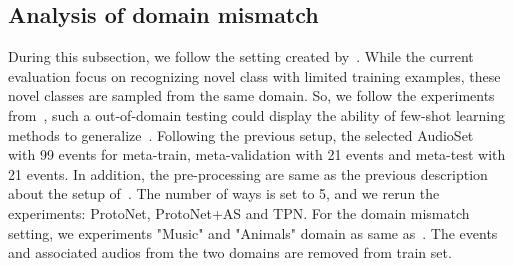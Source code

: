 \documentclass[a4paper]{article}
\begin{document}
\subsection{Analysis of domain mismatch}
\vspace{-2mm}
During this subsection, we follow the setting created by~\cite{fewshotdomain}. While the current evaluation focus on recognizing novel class with limited training examples, these novel classes are sampled from the same domain. So, we follow the experiments from~\cite{fewshotdomain}, such a out-of-domain testing could display the ability of few-shot learning methods to generalize~\cite{domainad,domain_ad}. Following the previous setup, the selected AudioSet~\cite{audioSet} with 99 events for meta-train, meta-validation with 21 events and meta-test with 21 events. In addition, the pre-processing are same as the previous description about the setup of~\cite{attentionSimilarity}. The number of ways is set to 5, and we rerun the experiments: ProtoNet, ProtoNet+AS and TPN. For the domain mismatch setting, we experiments "Music" and "Animals" domain as same as~\cite{fewshotdomain}. The events and associated audios from the two domains are removed from train set.
\end{document}
